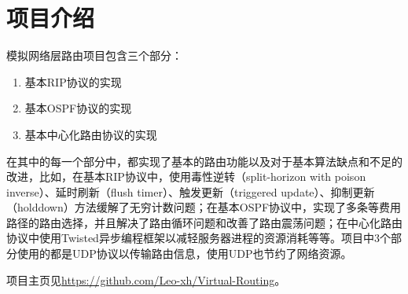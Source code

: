 \documentclass[15pt]{ctexart}
\begin{document}

\tableofcontents
\newpage
\section{项目介绍} %
\label{sec:项目介绍}
	模拟网络层路由项目包含三个部分：
	\begin{enumerate}
		\item 基本RIP协议的实现
		\item 基本OSPF协议的实现
		\item 基本中心化路由协议的实现
	\end{enumerate}
	\par 在其中的每一个部分中，都实现了基本的路由功能以及对于基本算法缺点和不足的改进，比如，在基本RIP协议中，使用毒性逆转（split-horizon with poison inverse）、延时刷新（flush timer）、触发更新（triggered update）、抑制更新（holddown）方法缓解了无穷计数问题；在基本OSPF协议中，实现了多条等费用路径的路由选择，并且解决了路由循环问题和改善了路由震荡问题；在中心化路由协议中使用Twisted异步编程框架以减轻服务器进程的资源消耗等等。项目中3个部分使用的都是UDP协议以传输路由信息，使用UDP也节约了网络资源。
	\par 项目主页见\url{https://github.com/Leo-xh/Virtual-Routing}。



\end{document}

